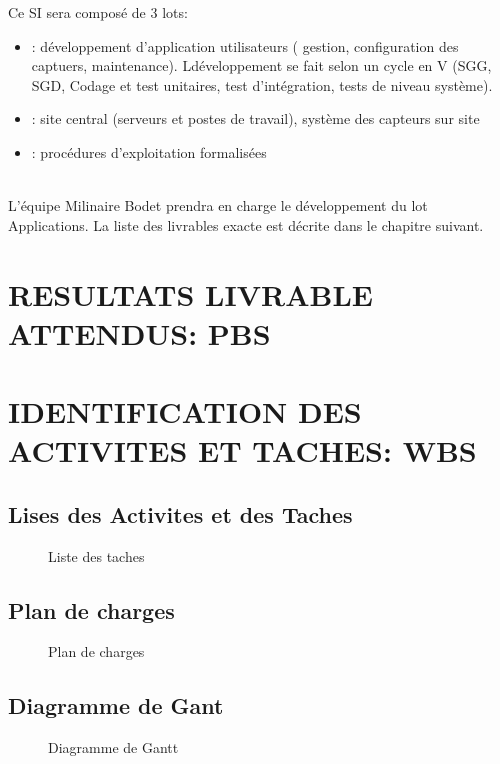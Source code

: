 \documentclass[]{scrartcl}
\begin{document}
Ce SI sera composé de 3 lots:
\begin{itemize}
\item {}: développement d'application utilisateurs ( gestion, configuration des captuers, maintenance). Ldéveloppement se fait selon un cycle en V (SGG, SGD, Codage et test unitaires, test d'intégration, tests de niveau système). 
\item {}: site central (serveurs et postes de travail), système des capteurs sur site
\item {}: procédures d'exploitation formalisées
\end{itemize}
\ \\
L'équipe Milinaire Bodet prendra en charge le développement du lot Applications. La liste des livrables exacte est décrite dans le chapitre suivant. 
\newpage
\section{RESULTATS LIVRABLE ATTENDUS: PBS}

\section{IDENTIFICATION DES ACTIVITES ET TACHES: WBS}
\subsection{Lises des Activites et des Taches}
\begin{center}
\begin{figure}[H]
\caption{Liste des taches}
\end{figure}
\end{center}
\subsection{Plan de charges}
\begin{center}
\begin{figure}[H]
\caption{Plan de charges}
\end{figure}
\end{center}
\subsection{Diagramme de Gant}
\begin{figure}[H]
\caption{Diagramme de Gantt}
\end{figure}
\end{document}

